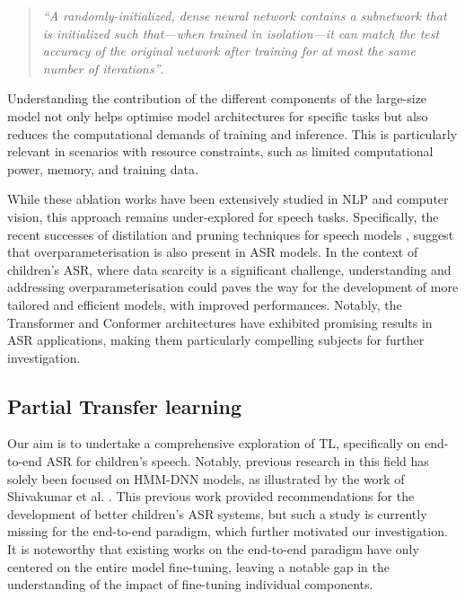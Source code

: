 \begin{quote}
    \textit{``A randomly-initialized, dense neural network contains a subnetwork that is initialized such that—when trained in isolation—it can match the test accuracy of the original network after training for at most the same number of iterations''}.
\end{quote}

Understanding the contribution of the different components of the large-size model not only helps optimise model architectures for specific tasks but also reduces the computational demands of training and inference. This is particularly relevant in scenarios with resource constraints, such as limited computational power, memory, and training data. 


While these ablation works have been extensively studied in NLP and computer vision, this approach remains under-explored for speech tasks. Specifically, the recent successes of distilation and pruning techniques for speech models \cite{gandhi2023distilwhisper,chang2022distilhubert,peng23c_interspeech}, suggest that overparameterisation is also present in ASR models. In the context of children's ASR, where data scarcity is a significant challenge, understanding and addressing overparameterisation could paves the way for the development of more tailored and efficient models, with improved performances. Notably, the Transformer and Conformer architectures have exhibited promising results in ASR applications, making them particularly compelling subjects for further investigation.


\subsection{Partial Transfer learning}

Our aim is to undertake a comprehensive exploration of TL, specifically on end-to-end ASR for children's speech. Notably, previous research in this field has solely been focused on HMM-DNN models, as illustrated by the work of Shivakumar et al. \cite{shivakumar2020transfer}. This previous work provided recommendations for the development of better children's ASR systems, but such a study is currently missing for the end-to-end paradigm, which  further motivated our investigation. It is noteworthy that existing works on the end-to-end paradigm have only centered on the entire model fine-tuning, leaving a notable gap in the understanding of the impact of fine-tuning individual components.


